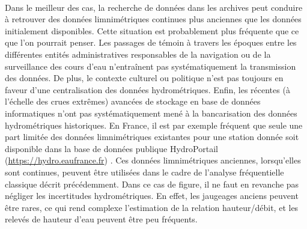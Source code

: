 	\paragraph{} Dans le meilleur des cas, la recherche de données dans les archives peut conduire à retrouver des données limnimétriques continues plus anciennes que les données initialement disponibles. Cette situation est probablement plus fréquente que ce que l'on pourrait penser. Les passages de témoin à travers les époques entre les différentes entités administratives responsables de la navigation ou de la surveillance des cours d'eau n'entraînent pas systématiquement la transmission des données. De plus, le contexte culturel ou politique n'est pas toujours en faveur d'une centralisation des données hydrométriques. Enfin, les récentes (à l'échelle des crues extrêmes) avancées de stockage en base de données informatiques n'ont pas systématiquement mené à la bancarisation des données hydrométriques historiques. En France, il est par exemple fréquent que seule une part limitée des données limnimétriques existantes pour une station donnée soit disponible dans la base de données publique HydroPortail (\url{https://hydro.eaufrance.fr}) \citep{le_gros_les_2015}. Ces données limnimétriques anciennes, lorsqu'elles sont continues, peuvent être utilisées dans le cadre de l'analyse fréquentielle classique décrit précédemment. Dans ce cas de figure, il ne faut en revanche pas négliger les incertitudes hydrométriques. En effet, les jaugeages anciens peuvent être rares, ce qui rend complexe l'estimation de la relation hauteur/débit, et les relevés de hauteur d'eau peuvent être peu fréquents.
	
